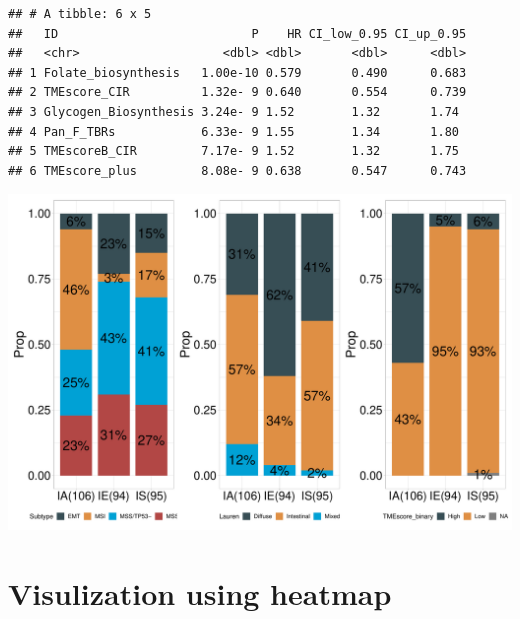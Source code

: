 \documentclass[
  12pt,
]{book}
\newenvironment{Shaded}{\begin{snugshade}}{\end{snugshade}}
\newcommand{\AttributeTok}[1]{\textcolor[rgb]{0.13,0.29,0.53}{#1}}
\newcommand{\DecValTok}[1]{\textcolor[rgb]{0.00,0.00,0.81}{#1}}
\newcommand{\FunctionTok}[1]{\textcolor[rgb]{0.13,0.29,0.53}{\textbf{#1}}}
\newcommand{\NormalTok}[1]{#1}
\newcommand{\OtherTok}[1]{\textcolor[rgb]{0.56,0.35,0.01}{#1}}
\newcommand{\SpecialCharTok}[1]{\textcolor[rgb]{0.81,0.36,0.00}{\textbf{#1}}}
\newcommand{\StringTok}[1]{\textcolor[rgb]{0.31,0.60,0.02}{#1}}
\theoremstyle{definition}
\theoremstyle{definition}
\theoremstyle{definition}
\theoremstyle{definition}
\theoremstyle{remark}
\begin{document}
\begin{verbatim}
## # A tibble: 6 x 5
##   ID                           P    HR CI_low_0.95 CI_up_0.95
##   <chr>                    <dbl> <dbl>       <dbl>      <dbl>
## 1 Folate_biosynthesis   1.00e-10 0.579       0.490      0.683
## 2 TMEscore_CIR          1.32e- 9 0.640       0.554      0.739
## 3 Glycogen_Biosynthesis 3.24e- 9 1.52        1.32       1.74 
## 4 Pan_F_TBRs            6.33e- 9 1.55        1.34       1.80 
## 5 TMEscoreB_CIR         7.17e- 9 1.52        1.32       1.75 
## 6 TMEscore_plus         8.08e- 9 0.638       0.547      0.743
\end{verbatim}

\begin{Shaded}
\end{Shaded}

\begin{center}\includegraphics{_main_files/figure-latex/unnamed-chunk-32-1} \end{center}

\hypertarget{visulization-using-heatmap}{%
\section{Visulization using heatmap}\label{visulization-using-heatmap}}
\end{document}
